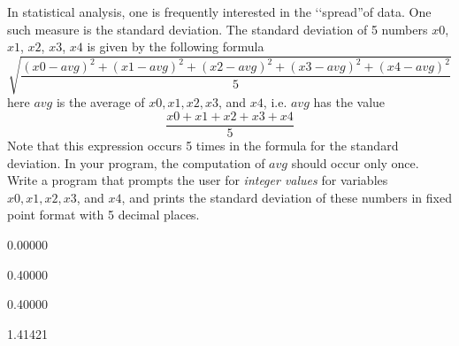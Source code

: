 In statistical analysis, one is frequently interested in the
\lq\lq spread''of data. One such measure is the
standard deviation.
The standard deviation of 5 numbers
$x0$, $x1$, $x2$, $x3$, $x4$ is given by the following
formula
\[
\sqrt{
\frac{
(x0 - avg)^2 + (x1 - avg)^2 + (x2 - avg)^2 + (x3 - avg)^2 +(x4 - avg)^2
}
{5}
}
\]
here $avg$ is the average of 
$x0,x1,x2,x3$, and $x4$, i.e. $avg$ has the value
\[
\frac{x0 + x1 + x2 + x3 + x4}{5}
\]
Note that this expression occurs 5 times in the formula for the 
standard deviation. 
In your program, the
computation of $avg$ should occur only once. 
Write a program that prompts the user for \textit{integer values}
for variables $x0,x1,x2,x3$, and $x4$, and prints the 
standard deviation of these numbers in fixed point
format with 5 decimal places.

\resett
\nextt
\begin{console}[commandchars=\\\{\}]
0.00000
\end{console}

\nextt
\begin{console}[commandchars=\\\{\}]
0.40000
\end{console}

\nextt
\begin{console}[commandchars=\\\{\}]
0.40000
\end{console}

\nextt
\begin{console}[commandchars=\\\{\}]
1.41421
\end{console}
